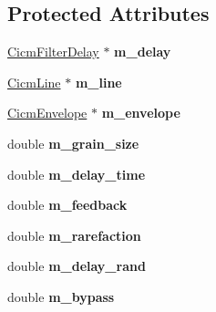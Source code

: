 \subsection*{Protected Attributes}
\begin{DoxyCompactItemize}
\item 
\hypertarget{class_cicm_qsgs_a5b567b99c91b95712ce0fe7900f66160}{\hyperlink{class_cicm_filter_delay}{Cicm\-Filter\-Delay} $\ast$ {\bfseries m\-\_\-delay}}\label{class_cicm_qsgs_a5b567b99c91b95712ce0fe7900f66160}

\item 
\hypertarget{class_cicm_qsgs_a409b89233b3f57e6b916561f44e186ae}{\hyperlink{class_cicm_line}{Cicm\-Line} $\ast$ {\bfseries m\-\_\-line}}\label{class_cicm_qsgs_a409b89233b3f57e6b916561f44e186ae}

\item 
\hypertarget{class_cicm_qsgs_a99883132ce396c3f0acdf4ffaa945d54}{\hyperlink{class_cicm_envelope}{Cicm\-Envelope} $\ast$ {\bfseries m\-\_\-envelope}}\label{class_cicm_qsgs_a99883132ce396c3f0acdf4ffaa945d54}

\item 
\hypertarget{class_cicm_qsgs_af5f969399ec40d48bca02017433a3f95}{double {\bfseries m\-\_\-grain\-\_\-size}}\label{class_cicm_qsgs_af5f969399ec40d48bca02017433a3f95}

\item 
\hypertarget{class_cicm_qsgs_a6b22a167673118548c251d69e85a8247}{double {\bfseries m\-\_\-delay\-\_\-time}}\label{class_cicm_qsgs_a6b22a167673118548c251d69e85a8247}

\item 
\hypertarget{class_cicm_qsgs_af4a94ec4deb360f142cc8ded464c87b5}{double {\bfseries m\-\_\-feedback}}\label{class_cicm_qsgs_af4a94ec4deb360f142cc8ded464c87b5}

\item 
\hypertarget{class_cicm_qsgs_ad8fdde8cb4848f494e625487a5f6e8fa}{double {\bfseries m\-\_\-rarefaction}}\label{class_cicm_qsgs_ad8fdde8cb4848f494e625487a5f6e8fa}

\item 
\hypertarget{class_cicm_qsgs_ac585748fefd48279a465c23462d95178}{double {\bfseries m\-\_\-delay\-\_\-rand}}\label{class_cicm_qsgs_ac585748fefd48279a465c23462d95178}

\item 
\hypertarget{class_cicm_qsgs_a52b4a171c4b2dbb34257405cf753e364}{double {\bfseries m\-\_\-bypass}}\label{class_cicm_qsgs_a52b4a171c4b2dbb34257405cf753e364}


\end{DoxyCompactItemize}
